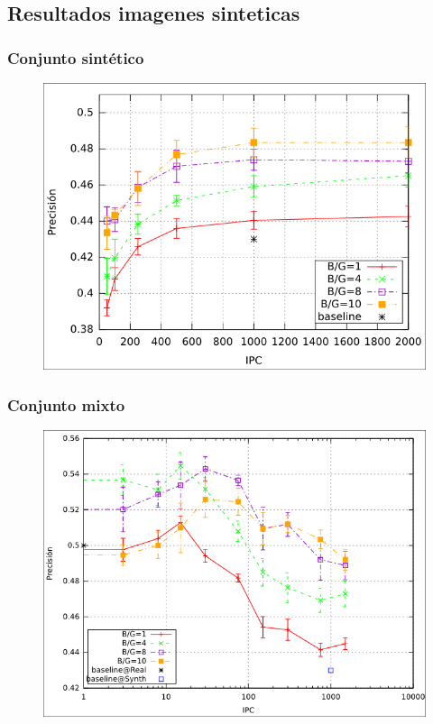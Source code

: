 	\subsection{Resultados imagenes sinteticas}
		\begin{frame}
			\frametitle{Conjunto sintético}
			\begin{figure}[htbp!]
				\centering
				\centerline{
					\includegraphics[height=0.65\paperheight]{../img/resultados/sinteticas/mean_2040.png}
				}
			\end{figure}
		\end{frame}
		\begin{frame}
			\frametitle{Conjunto mixto}
			\begin{figure}[htbp!]
				\centering
				\centerline{
					\includegraphics[height=0.65\paperheight]{../img/resultados/mixtas/best_mean_2040.png}
				}
			\end{figure}
		\end{frame}
